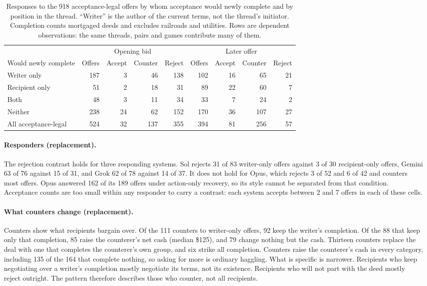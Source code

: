 \begin{table}[htbp]
\centering\small
\begin{tabular}{@{}lrrrrrrrr@{}}
\toprule
& \multicolumn{4}{c}{Opening bid} & \multicolumn{4}{c}{Later offer}\\
\cmidrule(lr){2-5}\cmidrule(l){6-9}
Would newly complete & Offers & Accept & Counter & Reject & Offers & Accept & Counter & Reject\\
\midrule
Writer only & 187 & 3 & 46 & 138 & 102 & 16 & 65 & 21\\
Recipient only & 51 & 2 & 18 & 31 & 89 & 22 & 60 & 7\\
Both & 48 & 3 & 11 & 34 & 33 & 7 & 24 & 2\\
Neither & 238 & 24 & 62 & 152 & 170 & 36 & 107 & 27\\
\midrule
All acceptance-legal & 524 & 32 & 137 & 355 & 394 & 81 & 256 & 57\\
\bottomrule
\end{tabular}
\caption{Responses to the 918 acceptance-legal offers by whom acceptance would newly complete and by position in the thread. ``Writer'' is the author of the current terms, not the thread's initiator. Completion counts mortgaged deeds and excludes railroads and utilities. Rows are dependent observations: the same threads, pairs and games contribute many of them.}
\label{tab:position}
\end{table}

\paragraph{Responders (replacement).} The rejection contrast holds for three responding systems. Sol rejects 31 of 83 writer-only offers against 3 of 30 recipient-only offers, Gemini 63 of 76 against 15 of 31, and Grok 62 of 78 against 14 of 37. It does not hold for Opus, which rejects 3 of 52 and 6 of 42 and counters most offers. Opus answered 162 of its 189 offers under action-only recovery, so its style cannot be separated from that condition. Acceptance counts are too small within any responder to carry a contrast: each system accepts between 2 and 7 offers in each of these cells.

\paragraph{What counters change (replacement).} Counters show what recipients bargain over. Of the 111 counters to writer-only offers, 92 keep the writer's completion. Of the 88 that keep only that completion, 85 raise the counterer's net cash (median \$125), and 79 change nothing but the cash. Thirteen counters replace the deal with one that completes the counterer's own group, and six strike all completion. Counters raise the counterer's cash in every category, including 135 of the 164 that complete nothing, so asking for more is ordinary haggling. What is specific is narrower. Recipients who keep negotiating over a writer's completion mostly negotiate its terms, not its existence. Recipients who will not part with the deed mostly reject outright. The pattern therefore describes those who counter, not all recipients.

